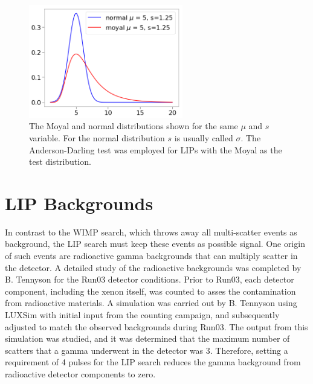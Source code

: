 \begin{figure}[htbp]
\begin{center}
\includegraphics[width=0.6\textwidth]{figures/lips/pdfs.png}
\caption{ The Moyal and normal distributions shown for the same $\mu$ and $s$ variable. For the normal distribution $s$ is usually called $\sigma$. The Anderson-Darling test was employed for \acs{LIP}s with the Moyal as the test distribution.  }
\label{fig:pdfs}
\end{center}
\end{figure}

\FloatBarrier
\section{LIP Backgrounds}
In contrast to the \ac{WIMP} search, which throws away all multi-scatter events as background, the \ac{LIP} search must keep these events as possible signal. One origin of such events are radioactive gamma backgrounds that can multiply scatter in the detector. A detailed study of the radioactive backgrounds was completed by B. Tennyson \cite{Tennyson2017} for the Run03 detector conditions. Prior to Run03, each detector component, including the xenon itself, was counted to asses the contamination from radioactive materials. A simulation was carried out by B. Tennyson using LUXSim with initial input from the counting campaign, and subsequently adjusted to match the observed backgrounds during Run03. The output from this simulation was studied, and it was determined that the maximum number of scatters that a gamma underwent in the detector was 3. Therefore, setting a requirement of 4 pulses for the \ac{LIP} search reduces the gamma background from radioactive detector components to zero. 

